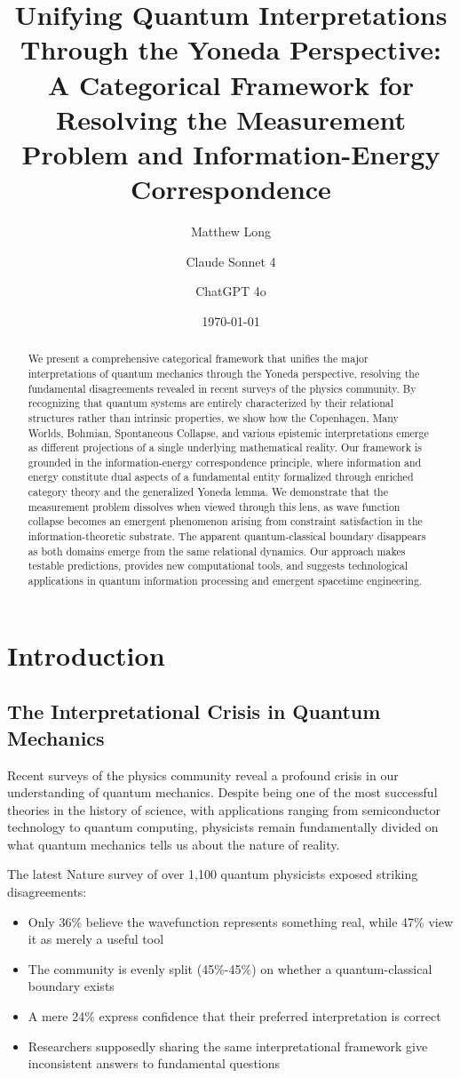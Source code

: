 \documentclass[12pt,a4paper]{article}
\title{Unifying Quantum Interpretations Through the Yoneda Perspective: A Categorical Framework for Resolving the Measurement Problem and Information-Energy Correspondence}
\author[1]{Matthew Long}
\author[2]{Claude Sonnet 4}
\author[3]{ChatGPT 4o}
\affil[1]{YonedaAI}
\affil[2]{Anthropic}
\affil[3]{OpenAI}
\date{\today}
\begin{document}
\maketitle

\begin{abstract}
We present a comprehensive categorical framework that unifies the major interpretations of quantum mechanics through the Yoneda perspective, resolving the fundamental disagreements revealed in recent surveys of the physics community. By recognizing that quantum systems are entirely characterized by their relational structures rather than intrinsic properties, we show how the Copenhagen, Many Worlds, Bohmian, Spontaneous Collapse, and various epistemic interpretations emerge as different projections of a single underlying mathematical reality. Our framework is grounded in the information-energy correspondence principle, where information and energy constitute dual aspects of a fundamental entity formalized through enriched category theory and the generalized Yoneda lemma. We demonstrate that the measurement problem dissolves when viewed through this lens, as wave function collapse becomes an emergent phenomenon arising from constraint satisfaction in the information-theoretic substrate. The apparent quantum-classical boundary disappears as both domains emerge from the same relational dynamics. Our approach makes testable predictions, provides new computational tools, and suggests technological applications in quantum information processing and emergent spacetime engineering.
\end{abstract}

\section{Introduction}

\subsection{The Interpretational Crisis in Quantum Mechanics}

Recent surveys of the physics community reveal a profound crisis in our understanding of quantum mechanics. Despite being one of the most successful theories in the history of science, with applications ranging from semiconductor technology to quantum computing, physicists remain fundamentally divided on what quantum mechanics tells us about the nature of reality.

The latest Nature survey of over 1,100 quantum physicists exposed striking disagreements:
\begin{itemize}
\item Only 36\% believe the wavefunction represents something real, while 47\% view it as merely a useful tool
\item The community is evenly split (45\%-45\%) on whether a quantum-classical boundary exists
\item A mere 24\% express confidence that their preferred interpretation is correct
\item Researchers supposedly sharing the same interpretational framework give inconsistent answers to fundamental questions
\end{itemize}
\end{document}
